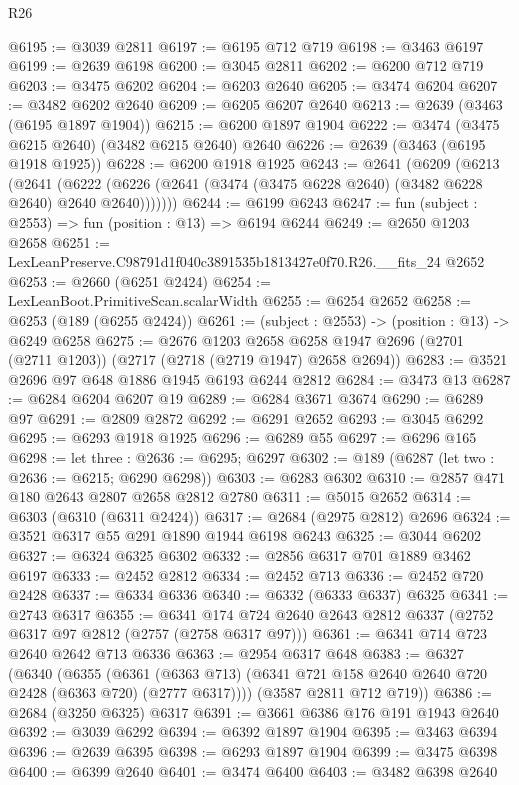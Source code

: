 \begin{lexlean}{R26}
\begin{coremodule}
@6195 := @3039 @2811
@6197 := @6195 @712 @719
@6198 := @3463 @6197
@6199 := @2639 @6198
@6200 := @3045 @2811
@6202 := @6200 @712 @719
@6203 := @3475 @6202
@6204 := @6203 @2640
@6205 := @3474 @6204
@6207 := @3482 @6202 @2640
@6209 := @6205 @6207 @2640
@6213 := @2639 (@3463 (@6195 @1897 @1904))
@6215 := @6200 @1897 @1904
@6222 := @3474 (@3475 @6215 @2640) (@3482 @6215 @2640) @2640
@6226 := @2639 (@3463 (@6195 @1918 @1925))
@6228 := @6200 @1918 @1925
@6243 := @2641
    (@6209
      (@6213
        (@2641
          (@6222 (@6226 (@2641 (@3474 (@3475 @6228 @2640) (@3482 @6228 @2640) @2640 @2640)))))))
@6244 := @6199 @6243
@6247 := fun (subject : @2553) => fun (position : @13) => @6194 @6244
@6249 := @2650 @1203 @2658
@6251 := LexLeanPreserve.C98791d1f040c3891535b1813427e0f70.R26.__fits_24 @2652
@6253 := @2660 (@6251 @2424)
@6254 := LexLeanBoot.PrimitiveScan.scalarWidth
@6255 := @6254 @2652
@6258 := @6253 (@189 (@6255 @2424))
@6261 := (subject : @2553) -> (position : @13) -> @6249 @6258
@6275 := @2676
    @1203
    @2658
    @6258
    @1947
    @2696
    (@2701 (@2711 @1203))
    (@2717 (@2718 (@2719 @1947) @2658 @2694))
@6283 := @3521 @2696 @97 @648 @1886 @1945 @6193 @6244 @2812
@6284 := @3473 @13
@6287 := @6284 @6204 @6207 @19
@6289 := @6284 @3671 @3674
@6290 := @6289 @97
@6291 := @2809 @2872
@6292 := @6291 @2652
@6293 := @3045 @6292
@6295 := @6293 @1918 @1925
@6296 := @6289 @55
@6297 := @6296 @165
@6298 := let three : @2636 := @6295; @6297
@6302 := @189 (@6287 (let two : @2636 := @6215; @6290 @6298))
@6303 := @6283 @6302
@6310 := @2857 @471 @180 @2643 @2807 @2658 @2812 @2780
@6311 := @5015 @2652
@6314 := @6303 (@6310 (@6311 @2424))
@6317 := @2684 (@2975 @2812) @2696
@6324 := @3521 @6317 @55 @291 @1890 @1944 @6198 @6243
@6325 := @3044 @6202
@6327 := @6324 @6325 @6302
@6332 := @2856 @6317 @701 @1889 @3462 @6197
@6333 := @2452 @2812
@6334 := @2452 @713
@6336 := @2452 @720 @2428
@6337 := @6334 @6336
@6340 := @6332 (@6333 @6337) @6325
@6341 := @2743 @6317
@6355 := @6341 @174 @724 @2640 @2643 @2812 @6337 (@2752 @6317 @97 @2812 (@2757 (@2758 @6317 @97)))
@6361 := @6341 @714 @723 @2640 @2642 @713 @6336
@6363 := @2954 @6317 @648
@6383 := @6327
    (@6340
      (@6355
        (@6361 (@6363 @713) (@6341 @721 @158 @2640 @2640 @720 @2428 (@6363 @720) (@2777 @6317))))
      (@3587 @2811 @712 @719))
@6386 := @2684 (@3250 @6325) @6317
@6391 := @3661 @6386 @176 @191 @1943 @2640
@6392 := @3039 @6292
@6394 := @6392 @1897 @1904
@6395 := @3463 @6394
@6396 := @2639 @6395
@6398 := @6293 @1897 @1904
@6399 := @3475 @6398
@6400 := @6399 @2640
@6401 := @3474 @6400
@6403 := @3482 @6398 @2640

\end{coremodule}
\end{lexlean}
